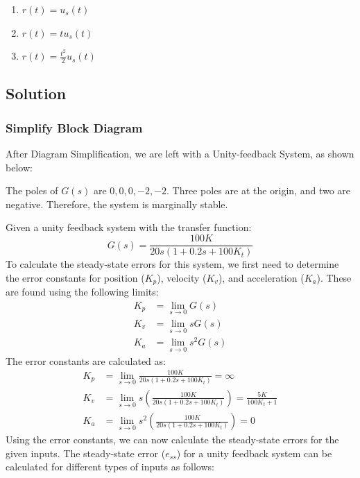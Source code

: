 \documentclass[11pt]{article}
\begin{document}
\begin{enumerate}
    \item \( r(t) = u_s(t) \)
    \item \( r(t) = tu_s(t) \)
    \item \( r(t) = \frac{t^2}{2}u_s(t) \)
\end{enumerate}

\newpage
\subsection*{Solution}
\subsubsection*{Simplify Block Diagram}
After Diagram Simplification, we are left with a Unity-feedback System, as shown below:
\begin{center}
\end{center}
\noindent
The poles of \(G(s)\) are \(0, 0, 0, -2, -2\). Three poles are at the origin, and two are negative. Therefore, the system is marginally stable.

\noindent
Given a unity feedback system with the transfer function:
\[
G(s) = \frac{100K}{20s(1 + 0.2s + 100K_t)}
\]
To calculate the steady-state errors for this system, we first need to determine the error constants for position (\(K_p\)), velocity (\(K_v\)), and acceleration (\(K_a\)). These are found using the following limits:
\begin{align*}
K_p &= \lim_{s \to 0} G(s) \\
K_v &= \lim_{s \to 0} sG(s) \\
K_a &= \lim_{s \to 0} s^2G(s)
\end{align*}
The error constants are calculated as:
\begin{align*}
K_p &= \lim_{s \to 0} \frac{100K}{20s(1 + 0.2s + 100K_t)} = \infty \\
K_v &= \lim_{s \to 0} s \left(\frac{100K}{20s(1 + 0.2s + 100K_t)}\right) = \frac{5K}{100K_t + 1} \\
K_a &= \lim_{s \to 0} s^2 \left(\frac{100K}{20s(1 + 0.2s + 100K_t)}\right) = 0
\end{align*}
Using the error constants, we can now calculate the steady-state errors for the given inputs. The steady-state error (\(e_{ss}\)) for a unity feedback system can be calculated for different types of inputs as follows:
\end{document}
